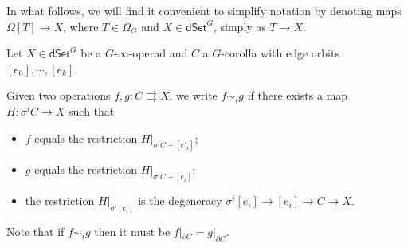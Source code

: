 \documentclass[a4paper,10pt
,draft
]{article}%
\renewcommand{\1}{\ensuremath{\mathbb{id}}}
\begin{document}
In what follows, we will find it convenient to simplify notation by denoting maps $\Omega[T] \to X$,
where $T \in \Omega_G$ and $X \in \mathsf{dSet}^G$,
simply as $T \to X$.


\begin{definition}
	Let $X \in \mathsf{dSet}^G$ be a $G$-$\infty$-operad and $C$ a $G$-corolla with edge orbits
	$[e_0],\cdots,[e_k]$.
	
	Given two operations 
	$f,g\colon C \rightrightarrows X$,
	we write $f \sim_i g$ if there exists a map
	$H \colon \sigma^i C \to X$ such that
\begin{itemize}
\item $f$ equals the restriction $H|_{\sigma^i C-[e'_i]}$;
\item $g$ equals the restriction $H|_{\sigma^i C-[e_i]}$;
\item the restriction $H|_{\sigma^i [e_i]}$
is the degeneracy $\sigma^i [e_i] \to [e_i] \to C \to X$.
\end{itemize}
\end{definition}


\begin{remark}\label{HOMOTBOUND REM}
	Note that if $f \sim_i g$ then it must be
	$f|_{\partial C} = g|_{\partial C}$.
\end{remark}
\end{document}
